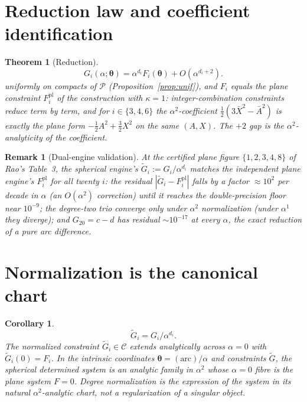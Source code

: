 \documentclass[pdflatex,sn-mathphys-num]{sn-jnl}
\theoremstyle{thmstyleone}%
\newtheorem{theorem}{Theorem}%
\newtheorem{corollary}{Corollary}%
\theoremstyle{thmstyletwo}%
\newtheorem{remark}{Remark}%
\theoremstyle{thmstylethree}%
\begin{document}
\section{Reduction law and coefficient identification}
\begin{theorem}[Reduction]\label{thm:red}
\begin{equation}\label{eq:reduction}
G_i(\alpha;\boldsymbol\theta)=\alpha^{d_i}F_i(\boldsymbol\theta)+O(\alpha^{d_i+2}).
\end{equation}
uniformly on compacts of $\mathcal P$ (Proposition~\ref{prop:unif}), and $F_i$ equals the plane constraint $F_i^{\mathrm{pl}}$ of the construction with $\kappa=1$: integer-combination constraints reduce term by term, and for $i\in\{3,4,6\}$ the $\alpha^2$-coefficient $\tfrac12(3\bar X^2-\bar A^2)$ is exactly the plane form $-\tfrac12A^2+\tfrac32X^2$ on the same $(A,X)$. The $+2$ gap is the $\alpha^2$-analyticity of the coefficient.
\end{theorem}
\begin{remark}[Dual-engine validation]
At the certified plane figure $\{1,2,3,4,8\}$ of Rao's Table~3, the spherical engine's $\widetilde G_i:=G_i/\alpha^{d_i}$ matches the independent plane engine's $F_i^{\mathrm{pl}}$ for all twenty $i$: the residual $|\widetilde G_i-F_i^{\mathrm{pl}}|$ falls by a factor $\approx10^2$ per decade in $\alpha$ (an $O(\alpha^2)$ correction) until it reaches the double-precision floor near $10^{-9}$; the degree-two trio converge only under $\alpha^2$ normalization (under $\alpha^1$ they diverge); and $G_{20}=c-d$ has residual $\sim10^{-17}$ at every $\alpha$, the exact reduction of a pure arc difference.
\end{remark}

\section{Normalization is the canonical chart}
\begin{corollary}\label{cor:chart}
\begin{equation}\label{eq:normalized}
\widetilde G_i=G_i/\alpha^{d_i}.
\end{equation}
The normalized constraint $\widetilde G_i\in\mathcal C$ extends analytically across $\alpha=0$ with $\widetilde G_i(0)=F_i$. In the intrinsic coordinates $\boldsymbol\theta=(\text{arc})/\alpha$ and constraints $\widetilde G$, the spherical determined system is an analytic family in $\alpha^2$ whose $\alpha=0$ fibre is the plane system $F=0$. Degree normalization is the expression of the system in its natural $\alpha^2$-analytic chart, not a regularization of a singular object.
\end{corollary}
\end{document}
